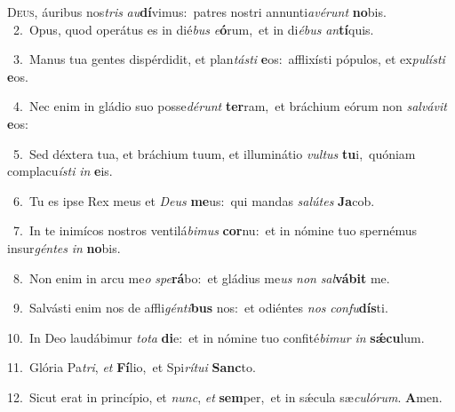 \lettrine{\initial\textcolor{\initialcolor}{D}}{eus,} áuribus nos\textit{tris} \textit{au}\-\textbf{dí}vimus:~\star patres nostri annunti\-\textit{a}\-\textit{vé}\textit{runt} \textbf{no}\-bis.\\
{\numbfont\textcolor{\numbcolor}{~2.}}~Opus, quod operátus es in dié\textit{bus} \textit{e}\-\textbf{ó}rum,~\star et in di\-\textit{é}\-\textit{bus} \textit{an}\-\textbf{tí}quis.\par
{\numbfont\textcolor{\numbcolor}{~3.}}~Manus tua gentes dispérdidit, et plan\-\textit{tás}\-\textit{ti} \textbf{e}\-os:~\star afflixísti pópulos, et ex\-\textit{pu}\-\textit{lís}\textit{ti} \textbf{e}\-os.\par
{\numbfont\textcolor{\numbcolor}{~4.}}~Nec enim in gládio suo posse\-\textit{dé}\-\textit{runt} \textbf{ter}\-ram,~\star et bráchium eórum non \textit{sal}\-\textit{vá}\textit{vit} \textbf{e}\-os:\par
{\numbfont\textcolor{\numbcolor}{~5.}}~Sed déxtera tua, et bráchium tuum, et illuminátio \textit{vul}\-\textit{tus} \textbf{tu}\-i,~\star quóniam complacu\-\textit{ís}\-\textit{ti} \textit{in} \textbf{e}\-is.\par
{\numbfont\textcolor{\numbcolor}{~6.}}~Tu es ipse Rex meus et \textit{De}\-\textit{us} \textbf{me}\-us:~\star qui mandas \textit{sa}\-\textit{lú}\textit{tes} \textbf{Ja}\-cob.\par
{\numbfont\textcolor{\numbcolor}{~7.}}~In te inimícos nostros ventilá\-\textit{bi}\-\textit{mus} \textbf{cor}\-nu:~\star et in nómine tuo spernémus insur\-\textit{gén}\-\textit{tes} \textit{in} \textbf{no}\-bis.\par
{\numbfont\textcolor{\numbcolor}{~8.}}~Non enim in arcu me\textit{o} \textit{spe}\-\textbf{rá}bo:~\star et gládius me\textit{us} \textit{non} \textit{sal}\-\textbf{vá}\textbf{bit} me.\par
{\numbfont\textcolor{\numbcolor}{~9.}}~Salvásti enim nos de affli\-\textit{gén}\-\textit{ti}\textbf{bus} nos:~\star et odiéntes \textit{nos} \textit{con}\-\textit{fu}\textbf{dís}ti.\par
{\numbfont\textcolor{\numbcolor}{10.}}~In Deo laudábimur \textit{to}\-\textit{ta} \textbf{di}\-e:~\star et in nómine tuo confité\-\textit{bi}\-\textit{mur} \textit{in} \textbf{sǽ}\-\textbf{cu}lum.\par
{\numbfont\textcolor{\numbcolor}{11.}}~Glória Pa\-\textit{tri}\-, \textit{et} \textbf{Fí}\-lio,~\star et Spi\-\textit{rí}\-\textit{tu}\textit{i} \textbf{Sanc}\-to.\par
{\numbfont\textcolor{\numbcolor}{12.}}~Sicut erat in princípio, et \textit{nunc}\-, \textit{et} \textbf{sem}\-per,~\star et in sǽcula sæ\-\textit{cu}\-\textit{ló}\textit{rum}. \textbf{A}\-men.\par
